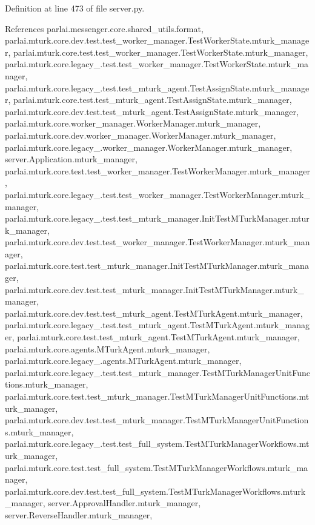 Definition at line 473 of file server.\+py.



References parlai.\+messenger.\+core.\+shared\+\_\+utils.\+format, parlai.\+mturk.\+core.\+dev.\+test.\+test\+\_\+worker\+\_\+manager.\+Test\+Worker\+State.\+mturk\+\_\+manager, parlai.\+mturk.\+core.\+test.\+test\+\_\+worker\+\_\+manager.\+Test\+Worker\+State.\+mturk\+\_\+manager, parlai.\+mturk.\+core.\+legacy\+\_.\+test.\+test\+\_\+worker\+\_\+manager.\+Test\+Worker\+State.\+mturk\+\_\+manager, parlai.\+mturk.\+core.\+legacy\+\_.\+test.\+test\+\_\+mturk\+\_\+agent.\+Test\+Assign\+State.\+mturk\+\_\+manager, parlai.\+mturk.\+core.\+test.\+test\+\_\+mturk\+\_\+agent.\+Test\+Assign\+State.\+mturk\+\_\+manager, parlai.\+mturk.\+core.\+dev.\+test.\+test\+\_\+mturk\+\_\+agent.\+Test\+Assign\+State.\+mturk\+\_\+manager, parlai.\+mturk.\+core.\+worker\+\_\+manager.\+Worker\+Manager.\+mturk\+\_\+manager, parlai.\+mturk.\+core.\+dev.\+worker\+\_\+manager.\+Worker\+Manager.\+mturk\+\_\+manager, parlai.\+mturk.\+core.\+legacy\+\_.\+worker\+\_\+manager.\+Worker\+Manager.\+mturk\+\_\+manager, server.\+Application.\+mturk\+\_\+manager, parlai.\+mturk.\+core.\+test.\+test\+\_\+worker\+\_\+manager.\+Test\+Worker\+Manager.\+mturk\+\_\+manager, parlai.\+mturk.\+core.\+legacy\+\_.\+test.\+test\+\_\+worker\+\_\+manager.\+Test\+Worker\+Manager.\+mturk\+\_\+manager, parlai.\+mturk.\+core.\+legacy\+\_.\+test.\+test\+\_\+mturk\+\_\+manager.\+Init\+Test\+M\+Turk\+Manager.\+mturk\+\_\+manager, parlai.\+mturk.\+core.\+dev.\+test.\+test\+\_\+worker\+\_\+manager.\+Test\+Worker\+Manager.\+mturk\+\_\+manager, parlai.\+mturk.\+core.\+test.\+test\+\_\+mturk\+\_\+manager.\+Init\+Test\+M\+Turk\+Manager.\+mturk\+\_\+manager, parlai.\+mturk.\+core.\+dev.\+test.\+test\+\_\+mturk\+\_\+manager.\+Init\+Test\+M\+Turk\+Manager.\+mturk\+\_\+manager, parlai.\+mturk.\+core.\+dev.\+test.\+test\+\_\+mturk\+\_\+agent.\+Test\+M\+Turk\+Agent.\+mturk\+\_\+manager, parlai.\+mturk.\+core.\+legacy\+\_.\+test.\+test\+\_\+mturk\+\_\+agent.\+Test\+M\+Turk\+Agent.\+mturk\+\_\+manager, parlai.\+mturk.\+core.\+test.\+test\+\_\+mturk\+\_\+agent.\+Test\+M\+Turk\+Agent.\+mturk\+\_\+manager, parlai.\+mturk.\+core.\+agents.\+M\+Turk\+Agent.\+mturk\+\_\+manager, parlai.\+mturk.\+core.\+legacy\+\_.\+agents.\+M\+Turk\+Agent.\+mturk\+\_\+manager, parlai.\+mturk.\+core.\+legacy\+\_.\+test.\+test\+\_\+mturk\+\_\+manager.\+Test\+M\+Turk\+Manager\+Unit\+Functions.\+mturk\+\_\+manager, parlai.\+mturk.\+core.\+test.\+test\+\_\+mturk\+\_\+manager.\+Test\+M\+Turk\+Manager\+Unit\+Functions.\+mturk\+\_\+manager, parlai.\+mturk.\+core.\+dev.\+test.\+test\+\_\+mturk\+\_\+manager.\+Test\+M\+Turk\+Manager\+Unit\+Functions.\+mturk\+\_\+manager, parlai.\+mturk.\+core.\+legacy\+\_.\+test.\+test\+\_\+full\+\_\+system.\+Test\+M\+Turk\+Manager\+Workflows.\+mturk\+\_\+manager, parlai.\+mturk.\+core.\+test.\+test\+\_\+full\+\_\+system.\+Test\+M\+Turk\+Manager\+Workflows.\+mturk\+\_\+manager, parlai.\+mturk.\+core.\+dev.\+test.\+test\+\_\+full\+\_\+system.\+Test\+M\+Turk\+Manager\+Workflows.\+mturk\+\_\+manager, server.\+Approval\+Handler.\+mturk\+\_\+manager, server.\+Reverse\+Handler.\+mturk\+\_\+manager, 